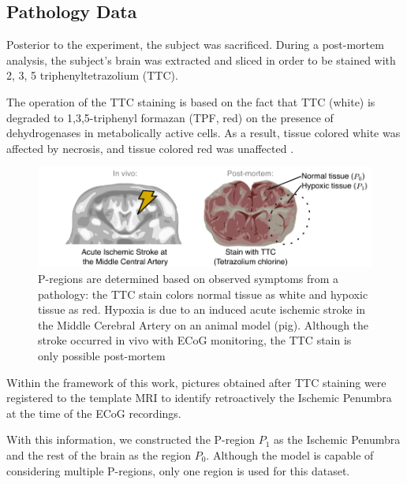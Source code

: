 \subsection{Pathology Data}

Posterior to the experiment, the subject was sacrificed.
%
During a post-mortem analysis, the subject's brain was extracted and sliced in order to be stained with 
2, 3, 5 triphenyltetrazolium (TTC).

The operation of the TTC staining is based on the fact that TTC (white) 
is degraded to 1,3,5-triphenyl formazan (TPF, red)
on the presence of dehydrogenases in metabolically active cells.
%
As a result, tissue colored white was affected by necrosis, and tissue colored red was unaffected \cite{li2018use}. 

\begin{figure}
\centering
\includegraphics[width=\linewidth]{./img/Pregions_real.pdf}
\caption{P-regions are determined based on observed symptoms from a pathology: the TTC stain colors normal tissue as white and hypoxic tissue as red.
%
Hypoxia is due to an induced acute ischemic stroke in the Middle Cerebral Artery on an animal model (pig).
%
Although the stroke occurred in vivo with ECoG monitoring, the TTC stain is only possible post-mortem}
\end{figure}

Within the framework of this work, pictures obtained after TTC staining were registered to the template MRI to identify retroactively the Ischemic Penumbra at the time of the ECoG recordings.
%

With this information, we constructed the P-region $P_1$ as the Ischemic Penumbra and the rest of the brain as the region $P_0$.
%
%
Although the model is capable of considering multiple P-regions, only one region is used for this dataset.
